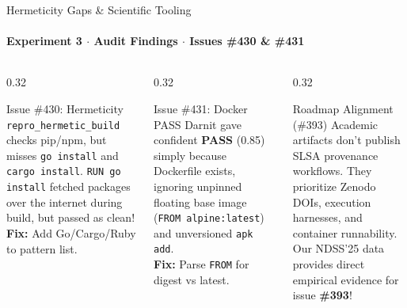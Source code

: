 \documentclass[aspectratio=169]{beamer}
\begin{document}
\begin{frame}{Hermeticity Gaps \& Scientific Tooling}
    \framesubtitle{Experiment 3 $\cdot$ Audit Findings $\cdot$ Issues \#430 \& \#431}
    \begin{columns}[T]
        \begin{column}{0.32\textwidth}
            \begin{alertblock}{Issue \#430: Hermeticity}
                \scriptsize
                \texttt{repro\_hermetic\_build} checks pip/npm, but misses \texttt{go install} and \texttt{cargo install}.
                \texttt{RUN go install} fetched packages over the internet during build, but passed as clean!\\
                \textbf{Fix:} Add Go/Cargo/Ruby to pattern list.
            \end{alertblock}
        \end{column}
        \begin{column}{0.32\textwidth}
            \begin{alertblock}{Issue \#431: Docker PASS}
                \scriptsize
                Darnit gave confident \textbf{PASS} (0.85) simply because Dockerfile exists, ignoring unpinned floating base image (\texttt{FROM alpine:latest}) and unversioned \texttt{apk add}.\\
                \textbf{Fix:} Parse \texttt{FROM} for digest vs latest.
            \end{alertblock}
        \end{column}
        \begin{column}{0.32\textwidth}
            \begin{block}{Roadmap Alignment (\#393)}
                \scriptsize
                Academic artifacts don't publish SLSA provenance workflows. They prioritize Zenodo DOIs, execution harnesses, and container runnability.\\
                Our NDSS'25 data provides direct empirical evidence for issue \textbf{\#393}!
            \end{block}
        \end{column}
    \end{columns}
\end{frame}
\end{document}
